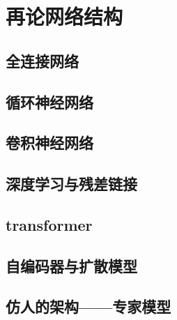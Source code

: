 \section{再论网络结构} %
\subsection{全连接网络}
\subsection{循环神经网络}
\subsection{卷积神经网络}
\subsection{深度学习与残差链接}
\subsection{transformer}
\subsection{自编码器与扩散模型}
\subsection{仿人的架构——专家模型}